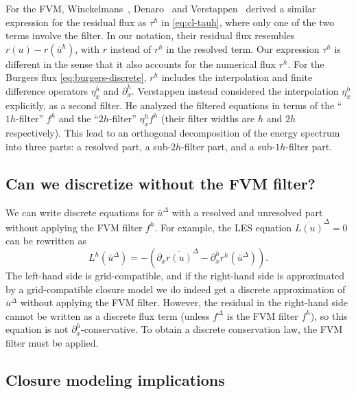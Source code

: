 \documentclass[preprint,twocolumn,5p]{elsarticle}
\begin{document}
For the FVM,
Winckelmans~\cite{winckelmansExplicitfilteringLargeeddySimulation2001},
Denaro~\cite{denaroWhatDoesFinite2011,denaroInconsistencefreeIntegralbasedDynamic2018}
and Verstappen~\cite{verstappenMergingFilteringModeling2025} derived a similar
expression for the residual flux as
$\tau^h$ in \cref{eq:cl-tauh},
where only one of the two terms involve the filter.
In our notation, their residual flux resembles $r(u) - r(\bar{u}^h)$, with $r$
instead of $r^h$ in the resolved term.
Our expression $\tau^h$ is different in the sense that it also accounts for the
numerical flux $r^h$. For the Burgers flux \eqref{eq:burgers-discrete}, $r^h$
includes the interpolation and finite difference operators $\eta^h_x$ and
$\partial^h_x$.
Verstappen instead considered the interpolation
$\eta^h_x$ explicitly, as a second filter. He analyzed the filtered equations in
terms of the ``$1 h$-filter'' $f^h$ and the ``$2 h$-filter'' $\eta^h_x f^h$
(their filter widths are $h$ and $2 h$ respectively).
This lead to an orthogonal decomposition of the energy spectrum into three
parts: a resolved part, a sub-$2 h$-filter part, and a sub-$1 h$-filter part.



\subsection{Can we discretize without the FVM filter?}

We can write discrete equations for $\bar{u}^\Delta$ with a resolved and
unresolved part without
applying the FVM filter $f^h$. 
For example, the LES equation $\overline{L(u)}^\Delta = 0$
can be rewritten as
\begin{equation}
    L^h(\bar{u}^\Delta) = -(\partial_x \overline{r(u)}^\Delta - \partial^h_x r^h(\bar{u}^\Delta)).
\end{equation}
The left-hand side is grid-compatible, and if the right-hand side is
approximated by a grid-compatible closure model we do indeed get a discrete
approximation of $\bar{u}^\Delta$ without applying the FVM filter.
However, the residual in the right-hand side cannot be written as a discrete
flux term (unless $f^\Delta$ is the FVM filter $f^h$),
so this equation is not $\partial^h_x$-conservative.
To obtain a discrete conservation law, the FVM filter must be applied.

\subsection{Closure modeling implications}
\label{sec:les-fvm-closure-implications}
\end{document}
